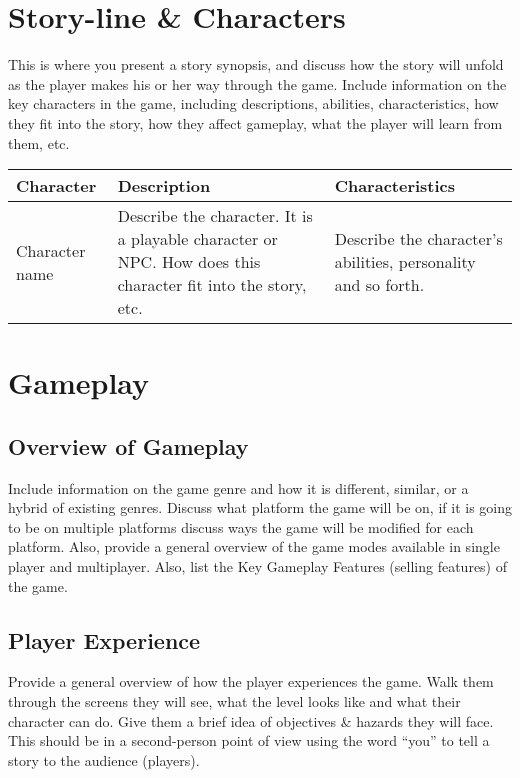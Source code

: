 \documentclass[a4paper, 12pt]{report}
\begin{document}
\chapter{Story-line \& Characters}
This is where you present a story synopsis, and discuss how the story will unfold as the player makes his or her way through the game. Include information on the key characters in the game, including descriptions, abilities, characteristics, how they fit into the story, how they affect gameplay, what the player will learn from them, etc. 

\begin{tabular}[h]{p{4 cm}|p{4 cm}|p{4cm}}
    \hline
    Character & Description & Characteristics
     \\
        \hline
         Character name & Describe the character. It is a playable character or NPC. How does this character fit into the story, etc. & Describe the character’s abilities, personality and so forth.
     \\
     \hline
\end{tabular}
\vspace{1 cm}

\chapter{Gameplay}

\section{Overview of Gameplay}
Include information on the game genre and how it is different, similar, or a hybrid of existing genres. Discuss what platform the game will be on, if it is going to be on multiple platforms discuss ways the game will be modified for each platform. Also, provide a general overview of the game modes available in single player and multiplayer. Also, list the Key Gameplay Features (selling features) of the game.

\section{Player Experience}
Provide a general overview of how the player experiences the game. Walk them through the screens they will see, what the level looks like and what their character can do. Give them a brief idea of objectives \& hazards they will face.  This should be in a second-person point of view using the word “you” to tell a story to the audience (players).
\end{document}
